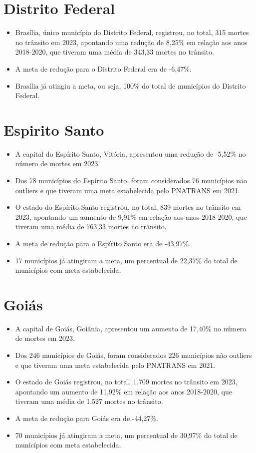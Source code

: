 \documentclass[
  letterpaper,
  DIV=11,
  numbers=noendperiod]{scrreprt}
\begin{document}
\section{Distrito Federal}\label{distrito-federal}

\begin{itemize}
\item
  Brasília, único município do Distrito Federal, registrou, no total,
  315 mortes no trânsito em 2023, apontando uma redução de 8,25\% em
  relação aos anos 2018-2020, que tiveram uma média de 343,33 mortes no
  trânsito.
\item
  A meta de redução para o Distrito Federal era de -6,47\%.
\item
  Brasília já atingiu a meta, ou seja, 100\% do total de municípios do
  Distrito Federal.
\end{itemize}

\section{Espirito Santo}\label{espirito-santo}

\begin{itemize}
\item
  A capital do Espírito Santo, Vitória, apresentou uma redução de
  -5,52\% no número de mortes em 2023.
\item
  Dos 78 municípios do Espírito Santo, foram considerados 76 municípios
  não outliers e que tiveram uma meta estabelecida pelo PNATRANS em
  2021.
\item
  O estado do Espírito Santo registrou, no total, 839 mortes no trânsito
  em 2023, apontando um aumento de 9,91\% em relação aos anos 2018-2020,
  que tiveram uma média de 763,33 mortes no trânsito.
\item
  A meta de redução para o Espírito Santo era de -43,97\%.
\item
  17 municípios já atingiram a meta, um percentual de 22,37\% do total
  de municípios com meta estabelecida.
\end{itemize}

\section{Goiás}\label{goiuxe1s}

\begin{itemize}
\item
  A capital de Goiás, Goiânia, apresentou um aumento de 17,40\% no
  número de mortes em 2023.
\item
  Dos 246 municípios de Goiás, foram considerados 226 municípios não
  outliers e que tiveram uma meta estabelecida pelo PNATRANS em 2021.
\item
  O estado de Goiás registrou, no total, 1.709 mortes no trânsito em
  2023, apontando um aumento de 11,92\% em relação aos anos 2018-2020,
  que tiveram uma média de 1.527 mortes no trânsito.
\item
  A meta de redução para Goiás era de -44,27\%.
\item
  70 municípios já atingiram a meta, um percentual de 30,97\% do total
  de municípios com meta estabelecida.
\end{itemize}
\end{document}
